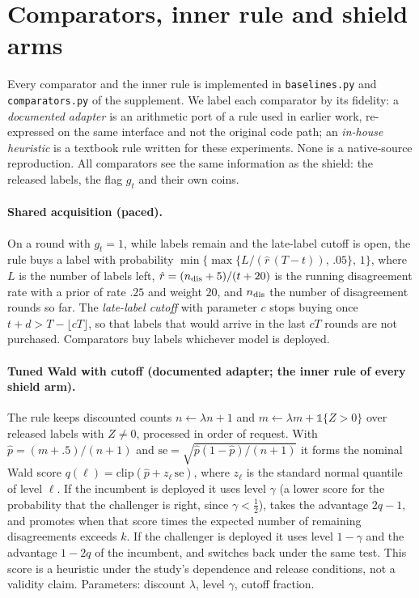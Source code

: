 \documentclass[10pt]{article}
\theoremstyle{plain}
\theoremstyle{definition}
\newcommand{\one}{\mathds{1}}
\begin{document}
\section{Comparators, inner rule and shield arms}\label{app:comp}
Every comparator and the inner rule is implemented in \texttt{baselines.py} and \texttt{comparators.py} of the supplement. We label each comparator by its fidelity: a \emph{documented adapter} is an arithmetic port of a rule used in earlier work, re-expressed on the same interface and not the original code path; an \emph{in-house heuristic} is a textbook rule written for these experiments. None is a native-source reproduction. All comparators see the same information as the shield: the released labels, the flag $g_t$ and their own coins.

\paragraph{Shared acquisition (paced).}
On a round with $g_t=1$, while labels remain and the late-label cutoff is open, the rule buys a label with probability $\min\{\max\{L/(\hat r\,(T-t)),\,.05\},\,1\}$, where $L$ is the number of labels left, $\hat r=(n_{\rm dis}+5)/(t+20)$ is the running disagreement rate with a prior of rate $.25$ and weight $20$, and $n_{\rm dis}$ the number of disagreement rounds so far. The \emph{late-label cutoff} with parameter $c$ stops buying once $t+d>T-\lfloor cT\rfloor$, so that labels that would arrive in the last $cT$ rounds are not purchased. Comparators buy labels whichever model is deployed.

\paragraph{Tuned Wald with cutoff (documented adapter; the inner rule of every shield arm).}
The rule keeps discounted counts $n\leftarrow\lambda n+1$ and $m\leftarrow\lambda m+\one\{Z>0\}$ over released labels with $Z\ne0$, processed in order of request. With $\hat p=(m+.5)/(n+1)$ and $\mathrm{se}=\sqrt{\hat p(1-\hat p)/(n+1)}$ it forms the nominal Wald score $q(\ell)=\mathrm{clip}(\hat p+z_\ell\,\mathrm{se})$, where $z_\ell$ is the standard normal quantile of level $\ell$. If the incumbent is deployed it uses level $\gamma$ (a lower score for the probability that the challenger is right, since $\gamma<\tfrac12$), takes the advantage $2q-1$, and promotes when that score times the expected number of remaining disagreements exceeds $k$. If the challenger is deployed it uses level $1-\gamma$ and the advantage $1-2q$ of the incumbent, and switches back under the same test. This score is a heuristic under the study's dependence and release conditions, not a validity claim. Parameters: discount $\lambda$, level $\gamma$, cutoff fraction.
\end{document}
